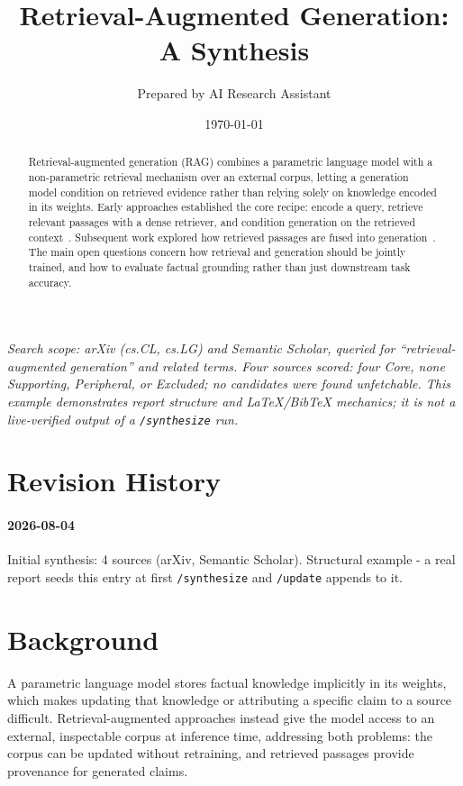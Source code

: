 \documentclass[11pt]{article}
\title{Retrieval-Augmented Generation: A Synthesis}
\author{Prepared by AI Research Assistant}
\date{\today}
\begin{document}
\maketitle

\noindent\textit{Search scope: arXiv (cs.CL, cs.LG) and Semantic Scholar, queried for
``retrieval-augmented generation'' and related terms. Four sources scored: four Core,
none Supporting, Peripheral, or Excluded; no candidates were found unfetchable. This
example demonstrates report structure and LaTeX/BibTeX mechanics; it is not a
live-verified output of a \texttt{/synthesize} run.}

\begin{abstract}
Retrieval-augmented generation (RAG) combines a parametric language model with a
non-parametric retrieval mechanism over an external corpus, letting a generation model
condition on retrieved evidence rather than relying solely on knowledge encoded in its
weights. Early approaches established the core recipe: encode a query, retrieve
relevant passages with a dense retriever, and condition generation on the retrieved
context~\citep{lewis2020rag,karpukhin2020dpr,guu2020realm}. Subsequent work explored
how retrieved passages are fused into generation~\citep{izacard2021fid}. The main open
questions concern how retrieval and generation should be jointly trained, and how to
evaluate factual grounding rather than just downstream task accuracy.
\end{abstract}

\section*{Revision History}
\paragraph{2026-08-04} Initial synthesis: 4 sources (arXiv, Semantic Scholar).
Structural example - a real report seeds this entry at first \texttt{/synthesize} and
\texttt{/update} appends to it.

\section{Background}
A parametric language model stores factual knowledge implicitly in its weights, which
makes updating that knowledge or attributing a specific claim to a source difficult.
Retrieval-augmented approaches instead give the model access to an external,
inspectable corpus at inference time, addressing both problems: the corpus can be
updated without retraining, and retrieved passages provide provenance for generated
claims.
\end{document}

